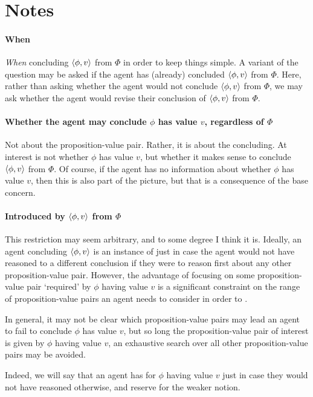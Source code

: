 \section{Notes}
\label{cha:zS:sec:notes}

\paragraph*{When}

\begin{note}
  \emph{When} concluding \(\langle \phi, v \rangle\) from \(\Phi\) in order to keep things simple.
  A variant of the question may be asked if the agent has (already) concluded \(\langle \phi, v \rangle\) from \(\Phi\).
  Here, rather than asking whether the agent would not conclude \(\langle \phi, v \rangle\) from \(\Phi\), we may ask whether the agent would revise their conclusion of \(\langle \phi, v \rangle\) from \(\Phi\).
\end{note}

\paragraph*{Whether the agent may conclude \(\phi\) has value \(v\), regardless of \(\Phi\)}

\begin{note}
  Not about the proposition-value pair.
  Rather, it is about the concluding.
  At interest is not whether \(\phi\) has value \(v\), but whether it makes sense to conclude \(\langle \phi, v \rangle\) from \(\Phi\).
  Of course, if the agent has no information about whether \(\phi\) has value \(v\), then this is also part of the picture, but that is a consequence of the base concern.
\end{note}

\paragraph*{Introduced by \(\langle \phi, v \rangle\) from \(\Phi\)}

\begin{note}
  This restriction may seem arbitrary, and to some degree I think it is.
  Ideally, an agent concluding \(\langle \phi, v \rangle\) is an instance of \csN{} just in case the agent would not have reasoned to a different conclusion if they were to reason first about any other proposition-value pair.
  However, the advantage of focusing on some proposition-value pair `required' by \(\phi\) having value \(v\) is a significant constraint on the range of proposition-value pairs an agent needs to consider in order to \csN{}.

  In general, it may not be clear which proposition-value pairs may lead an agent to fail to conclude \(\phi\) has value \(v\), but so long the proposition-value pair of interest is given by \(\phi\) having value \(v\), an exhaustive search over all other proposition-value pairs may be avoided.

  Indeed, we will say that an agent has \emph{\support{}} for \(\phi\) having value \(v\) just in case they would not have reasoned otherwise, and reserve \emph{\claiming{}} \support{} for the weaker notion.
\end{note}


